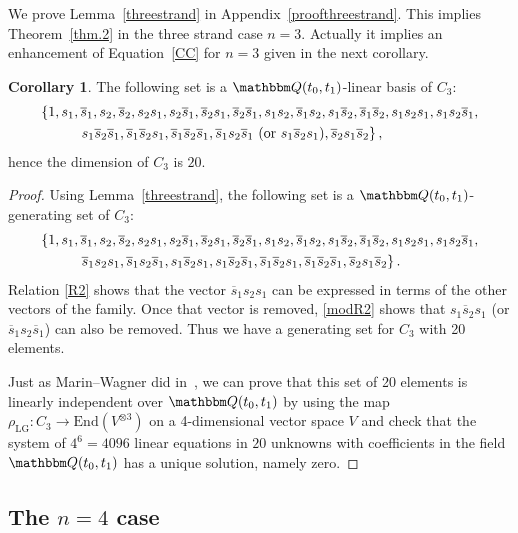 \documentclass[12pt,reqno]{amsart}
\theoremstyle{definition}
\newtheorem{corollary}[theorem]{Corollary}
\def\BQ{\mathbbm Q}
\def\be{\begin{equation}}
\def\ee{\end{equation}}
\def\End{\mathrm{End}}
\def\hs{\overline{s}}
\def\LG{\mathrm{LG}}
\begin{document}
We prove Lemma~\ref{threestrand} in Appendix~\ref{proofthreestrand}. This implies
Theorem~\ref{thm.2} in the three strand case $n=3$. Actually it implies an enhancement
of Equation~\eqref{CC} for $n=3$ given in the next corollary.

\begin{corollary}
\label{basisC3}
The following set is a $\BQ(t_0,t_1)$-linear basis of $C_3$:
\be
\label{bC3}
\begin{aligned}
\{1, s_1, \hs_1, s_2, \hs_2, s_2 s_1, s_2 \hs_1, \hs_2 s_1, \hs_2 \hs_1, s_1 s_2,
\hs_1 s_2, s_1 \hs_2, \hs_1 \hs_2, s_1 s_2 s_1, s_1 s_2 \hs_1, & \\
& \hspace{-10cm} s_1 \hs_2 \hs_1, \hs_1 \hs_2 s_1, \hs_1 \hs_2 \hs_1, \hs_1 s_2 \hs_1
\text{ (or $s_1 \hs_2 s_1$)}, \hs_2 s_1 \hs_2 \} \,,
\end{aligned}
\ee
hence the dimension of $C_3$ is $20$.
\end{corollary}

\begin{proof}
Using Lemma~\ref{threestrand}, the following set is a $\BQ(t_0,t_1)$-generating
set of $C_3$:
\be
\label{bC3b}
\begin{aligned}
\{1, s_1, \hs_1, s_2, \hs_2, s_2 s_1, s_2 \hs_1, \hs_2 s_1, \hs_2 \hs_1, s_1 s_2,
\hs_1 s_2, s_1 \hs_2, \hs_1 \hs_2, s_1 s_2 s_1, s_1 s_2 \hs_1, & \\
& \hspace{-10cm}
\hs_1 s_2 s_1,\hs_1 s_2 \hs_1, s_1 \hs_2 s_1, s_1 \hs_2 \hs_1, \hs_1 \hs_2 s_1,
\hs_1 \hs_2 \hs_1, \hs_2 s_1 \hs_2 \} \,.
\end{aligned}
\ee
Relation \eqref{R2} shows that the vector $\hs_1 s_2 s_1$ can be expressed
in terms of the other vectors of the family. Once that vector is removed,
\eqref{modR2} shows that
$s_1 \hs_2 s_1$ (or $\hs_1 s_2 \hs_1$) can also be removed. Thus we have
a generating set for $C_3$ with 20 elements.

Just as Marin--Wagner did in~\cite[Thm.1.1]{MW}, we can prove that this set
of 20 elements is linearly independent over $\BQ(t_0,t_1)$ by using the map
$\rho_{\LG}: C_3 \to \End(V^{\otimes 3})$ on a 4-dimensional vector space $V$
and check that the system of $4^6=4096$ linear equations in $20$ unknowns
with coefficients in the field $\BQ(t_0,t_1)$ has a unique solution, namely zero.
\end{proof}

\subsection{The \texorpdfstring{$n=4$}{n = 4} case}
\end{document}
